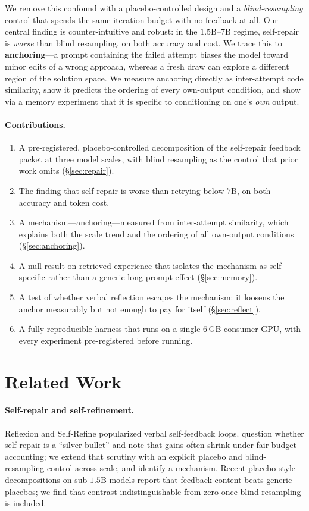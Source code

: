 \documentclass{article}
\begin{document}
We remove this confound with a placebo-controlled design and a
\emph{blind-resampling} control that spends the same iteration budget with no
feedback at all. Our central finding is counter-intuitive and robust: in the
$1.5$B--$7$B regime, self-repair is \emph{worse} than blind resampling, on
both accuracy and cost. We trace this to \textbf{anchoring}---a prompt
containing the failed attempt biases the model toward minor edits of a wrong
approach, whereas a fresh draw can explore a different region of the solution
space. We measure anchoring directly as inter-attempt code similarity, show it
predicts the ordering of every own-output condition, and show via a memory
experiment that it is specific to conditioning on one's \emph{own} output.

\paragraph{Contributions.}
\begin{enumerate}
  \item A pre-registered, placebo-controlled decomposition of the self-repair
  feedback packet at three model scales, with blind resampling as the control
  that prior work omits (\S\ref{sec:repair}).
  \item The finding that self-repair is worse than retrying below $7$B, on both
  accuracy and token cost.
  \item A mechanism---anchoring---measured from inter-attempt similarity, which
  explains both the scale trend and the ordering of all own-output conditions
  (\S\ref{sec:anchoring}).
  \item A null result on retrieved experience that isolates the mechanism as
  self-specific rather than a generic long-prompt effect (\S\ref{sec:memory}).
  \item A test of whether verbal reflection escapes the mechanism: it loosens
  the anchor measurably but not enough to pay for itself (\S\ref{sec:reflect}).
  \item A fully reproducible harness that runs on a single $6$\,GB consumer
  GPU, with every experiment pre-registered before running.
\end{enumerate}

\section{Related Work}
\label{sec:related}

\paragraph{Self-repair and self-refinement.}
Reflexion \citep{shinn2023reflexion} and Self-Refine
\citep{madaan2023selfrefine} popularized verbal self-feedback loops.
\citet{olausson2023selfrepair} question whether self-repair is a ``silver
bullet'' and note that gains often shrink under fair budget accounting; we
extend that scrutiny with an explicit placebo and blind-resampling control
across scale, and identify a mechanism. Recent placebo-style decompositions on
sub-$1.5$B models report that feedback content beats generic placebos; we find
that contrast indistinguishable from zero once blind resampling is included.
\end{document}

